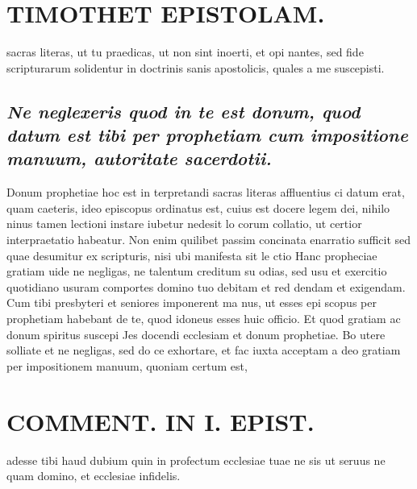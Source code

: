 \documentclass{article}
\begin{document}
\begin{pages}
\section*{TIMOTHET EPISTOLAM. }
\marginpar{[ p.111 ]}\pstart sacras literas, ut tu praedicas, ut non sint inoerti, et opi nantes, sed fide scripturarum solidentur in doctrinis sanis apostolicis, quales a me suscepisti.  \pend
{}
{}
\subsection*{\textit{Ne neglexeris quod in te est donum, quod datum est tibi per prophetiam cum impositione manuum, autoritate sacerdotii. }}\pstart Donum prophetiae hoc est in terpretandi sacras literas affluentius ci datum erat, quam caeteris, ideo episcopus ordinatus est, cuius est docere legem dei, nihilo ninus tamen lectioni instare iubetur nedesit lo corum collatio, ut certior interpraetatio habeatur. Non enim quilibet passim concinata enarratio sufficit sed quae desumitur ex scripturis, nisi ubi manifesta sit le ctio Hanc propheciae gratiam uide ne negligas, ne talentum creditum su odias, sed usu et exercitio quotidiano usuram comportes domino tuo debitam et red dendam et exigendam.  \pend\pstart Cum tibi presbyteri et seniores imponerent ma nus, ut esses epi scopus per prophetiam habebant de te, quod idoneus esses huic officio. Et quod gratiam ac donum spiritus suscepi Jes docendi ecclesiam et donum prophetiae. Bo utere solliate et ne negligas, sed do ce exhortare, et fac iuxta acceptam a deo gratiam per impositionem manuum, quoniam certum est,  \pend
\section*{COMMENT. IN I. EPIST. }
\marginpar{[ p.112 ]}\pstart adesse tibi haud dubium quin in profectum ecclesiae tuae ne sis ut seruus ne quam domino, et ecclesiae infidelis.  \pend
{}
{}

\end{pages}
\end{document}
